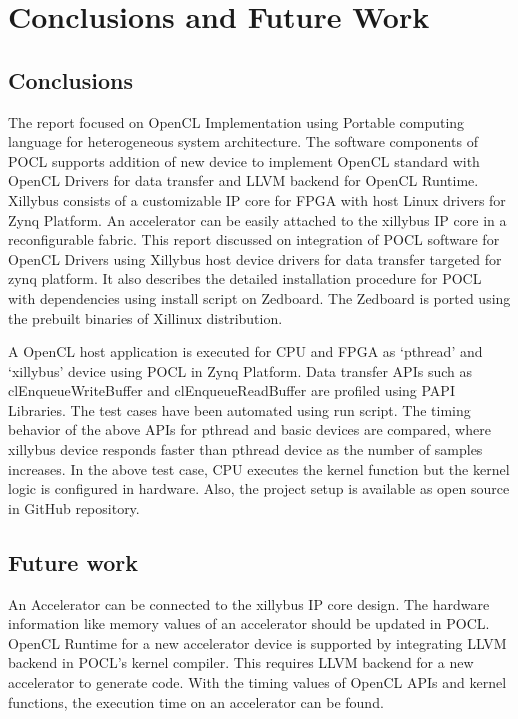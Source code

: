 \chapter{Conclusions and Future Work}
\label{ch6_Conclusions_and_Future_Work}

\section{Conclusions}
The report focused on OpenCL Implementation using Portable computing language for heterogeneous system architecture. The software components of POCL supports addition of new device to implement OpenCL standard with OpenCL Drivers for data transfer and LLVM backend for OpenCL Runtime. Xillybus consists of a customizable IP core for FPGA with host Linux drivers for Zynq Platform. An accelerator can be easily attached to the xillybus IP core in a reconfigurable fabric. This report discussed on integration of POCL software for OpenCL Drivers using Xillybus host device drivers for data transfer targeted for zynq platform. It also describes the detailed installation procedure for POCL with dependencies using install script on Zedboard. The Zedboard is ported using the prebuilt binaries of Xillinux distribution.

A OpenCL host application is executed for CPU and FPGA as ‘pthread’ and ‘xillybus’ device using POCL in Zynq Platform. Data transfer APIs such as clEnqueueWriteBuffer and clEnqueueReadBuffer are profiled using PAPI Libraries. The test cases have been automated using run script. The timing behavior of the above APIs for pthread and basic devices are compared, where xillybus device responds faster than pthread device as the number of samples increases. In the above test case, CPU executes the kernel function but the kernel logic is configured in hardware. Also, the project setup is available as open source in GitHub repository. 
 

\section{Future work}
An Accelerator can be connected to the xillybus IP core design. The hardware information like memory values of an accelerator should be updated in POCL. OpenCL Runtime for a new accelerator device is supported by integrating LLVM backend in POCL's kernel compiler. This requires LLVM backend for a new accelerator to generate code. With the timing values of OpenCL APIs and kernel functions, the execution time on an accelerator can be found.